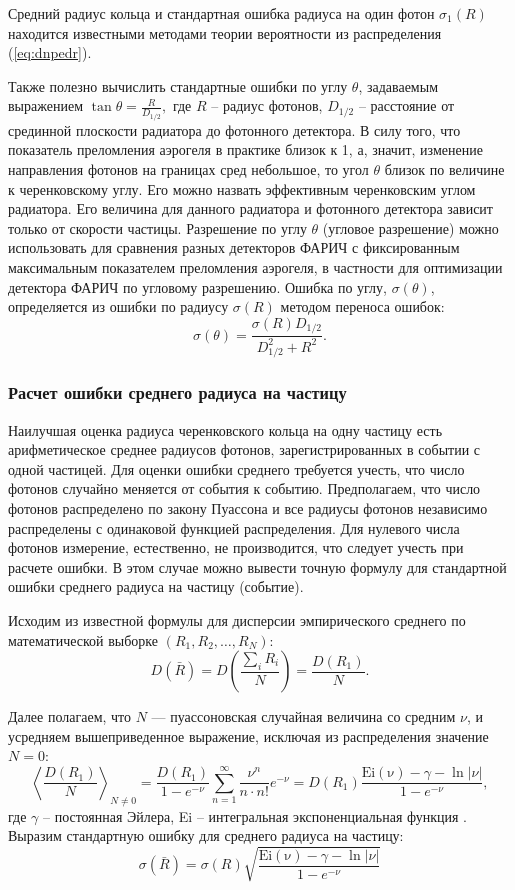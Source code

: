 \documentclass[12pt]{article}
\begin{document}
Средний радиус кольца и стандартная ошибка радиуса на один фотон $\sigma_1(R)$ находится известными методами теории вероятности из распределения (\ref{eq:dnpedr}).

Также полезно вычислить стандартные ошибки по углу $\theta$, задаваемым выражением 
\(\tan\theta = \frac{R}{D_{1/2}},\)
где $R$ -- радиус фотонов, $D_{1/2}$ -- расстояние от срединной плоскости радиатора до фотонного детектора.
В силу того, что показатель преломления аэрогеля в практике близок к 1, а, значит, изменение направления фотонов на границах сред небольшое, то 
угол $\theta$ близок по величине к черенковскому углу. Его можно назвать эффективным черенковским углом радиатора. Его величина для данного радиатора и фотонного детектора
зависит только от скорости частицы. Разрешение по углу $\theta$ (угловое разрешение) можно использовать для сравнения разных детекторов ФАРИЧ с фиксированным максимальным 
показателем преломления аэрогеля, в частности для оптимизации детектора ФАРИЧ по угловому разрешению.
Ошибка по углу, $\sigma(\theta)$, определяется из ошибки по радиусу $\sigma(R)$ методом переноса ошибок:
\[\sigma(\theta) = \frac{\sigma(R) D_{1/2}}{D_{1/2}^2+R^2}.\]

\subsubsection*{Расчет ошибки среднего радиуса на частицу}
Наилучшая оценка радиуса черенковского кольца на одну частицу есть арифметическое среднее радиусов фотонов, зарегистрированных в событии с одной частицей. 
Для оценки ошибки среднего требуется учесть, что число фотонов случайно меняется от события к событию. Предполагаем, что число фотонов
распределено по закону Пуассона и все радиусы фотонов независимо распределены с одинаковой функцией распределения. Для нулевого числа фотонов 
измерение, естественно, не производится, что следует учесть при расчете ошибки. 
В этом случае  можно вывести точную формулу для стандартной ошибки среднего радиуса на частицу (событие).

Исходим из известной формулы для дисперсии эмпирического среднего по математической выборке $(R_1, R_2, \ldots, R_N)$:
\[\displaystyle D(\bar{R}) = D\left(\frac{\sum_i R_i}{N}\right) = \frac{D(R_1)}{N}.\]

Далее полагаем, что $N$ --- пуассоновская случайная величина со средним $\nu$, и усредняем вышеприведенное выражение, исключая из распределения
значение \mbox{$N=0$}:
\[
\left\langle\frac{D(R_1)}{N}\right\rangle_{N\neq 0} = \frac{D(R_1)}{1-e^{-\nu}} \sum_{n=1}^{\infty} \frac{\nu^n}{n\cdot n!} e^{-\nu} = D(R_1) \frac{\mathrm{Ei(\nu)}-\gamma-\ln|\nu|}{1-e^{-\nu}},
\]
где $\gamma$ -- постоянная Эйлера, Ei -- интегральная экспоненциальная функция \cite{prudn}. Выразим стандартную ошибку для среднего радиуса на частицу:
\begin{equation}
\sigma(\bar{R}) = \sigma(R) \sqrt{\frac{\mathrm{Ei(\nu)}-\gamma-\ln|\nu|}{1-e^{-\nu}}}
\label{eq:sigmean}
\end{equation}
\end{document}
